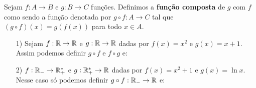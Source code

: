 \documentclass{beamer}
\begin{document}
    \begin{frame}
        \begin{definicao}
            Sejam $f : A \to B$ e $g : B \to C$ fun\c{c}\~oes. Definimos a \textbf{fun\c{c}\~ao composta} de $g$ com $f$ como sendo a fun\c{c}\~ao denotada por $g \circ f : A \to C$ tal que $(g\circ f)(x) = g(f(x))$ para todo $x \in A$.
        \end{definicao}
    \end{frame}

    \begin{frame}
        \begin{exemplos}
            \begin{enumerate}
                \item[1)] Sejam $f : \mathbb{R} \to \mathbb{R}$ e $g : \mathbb{R} \to \mathbb{R}$ dadas por $f(x) = x^2$ e $g(x) = x + 1$. Assim podemos definir $g \circ f$ e $f \circ g$ e:
            \end{enumerate}
        \end{exemplos}

        \vspace{5cm}
    \end{frame}
    
    \begin{frame}
        \vspace{5cm}    
    \end{frame}

    \begin{frame}
        \begin{exemplos}
            \begin{enumerate}
                \item[2)] $f : \mathbb{R}_- \to \mathbb{R}^*_+$ e $g : \mathbb{R}^*_+ \to \mathbb{R}$ dadas por $f(x) = x^2 + 1$ e $g(x) = \ln x$. Nesse caso s\'o podemos definir $g \circ f : \mathbb{R}_- \to \mathbb{R}$ e:
            \end{enumerate}
        \end{exemplos}

        \vspace{5cm}
    \end{frame}

    \begin{frame}
        \vspace{5cm}
    \end{frame}
\end{document}
